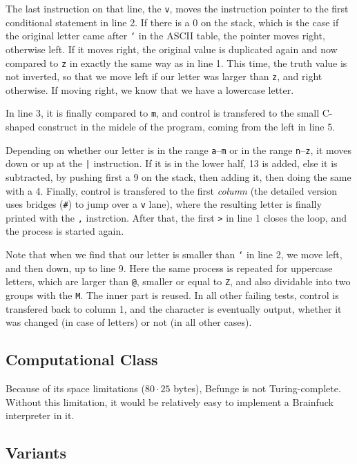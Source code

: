 The last instruction on that line, the \texttt{v}, moves the instruction pointer to the first conditional statement in line 2. If there is a 0 on the stack, which is the case if the original letter came after \texttt{`} in the ASCII table, the pointer moves right, otherwise left. If it moves right, the original value is duplicated again and now compared to \texttt{z} in exactly the same way as in line 1. This time, the truth value is not inverted, so that we move left if our letter was larger than \texttt{z}, and right otherwise. If moving right, we know that we have a lowercase letter.

In line 3, it is finally compared to \texttt{m}, and control is transfered to the small C-shaped construct in the midele of the program, coming from the left in line 5.

Depending on whether our letter is in the range \texttt{a}--\texttt{m} or in the range \texttt{n}--\texttt{z}, it moves down or up at the \texttt{|} instruction. If it is in the lower half, 13 is added, else it is subtracted, by pushing first a 9 on the stack, then adding it, then doing the same with a 4. Finally, control is transfered to the first \emph{column} (the detailed version uses bridges (\texttt{\#}) to jump over a \texttt{v} lane), where the resulting letter is finally printed with the \texttt{,} instrction. After that, the first \texttt{>} in line 1 closes the loop, and the process is started again.

Note that when we find that our letter is smaller than \texttt{`} in line 2, we move left, and then down, up to line 9. Here the same process is repeated for uppercase letters, which are larger than \texttt{@}, smaller or equal to \texttt{Z}, and also dividable into two groups with the \texttt{M}. The inner part is reused. In all other failing tests, control is transfered back to column 1, and the character is eventually output, whether it was changed (in case of letters) or not (in all other cases).

\subsection{Computational Class}

Because of its space limitations ($80\cdot 25$ bytes), Befunge is not Turing-complete. Without this limitation, it would be relatively easy to implement a Brainfuck interpreter in it.

\subsection{Variants}

